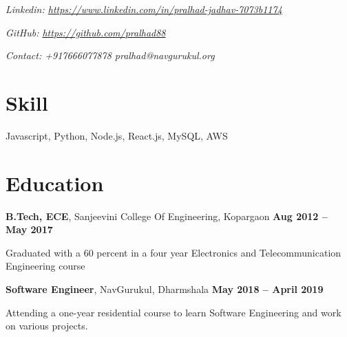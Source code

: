 \documentclass[margin,line]{resume}
\begin{document}
\begin{resume}
    \hfill \textsl{Linkedin: \url{https://www.linkedin.com/in/pralhad-jadhav-7073b1174}} 

    \hfill \textsl{GitHub: \url{https://github.com/pralhad88}} 

     \hfill \textsl{Contact: +917666077878 pralhad@navgurukul.org} 
    
    \section{\mysidestyle Skill}
    Javascript, Python, Node.js, React.js, MySQL, AWS \vspace{-1.5mm}
    
    
    \section {\mysidestyle Education}

    \textbf{B.Tech, ECE}, Sanjeevini College Of Engineering, Kopargaon \hfill \textbf{Aug 2012 -- May 2017}
    \begin{list2}
        \item Graduated with a 60 percent in a four year Electronics and Telecommunication Engineering course
    \end{list2}\vspace{-1.5mm}

    \textbf{Software Engineer}, NavGurukul, Dharmshala \hfill \textbf{May 2018 -- April 2019}
    \begin{list2}
        \item Attending a one-year residential course to learn Software Engineering and work on various projects​.
    \end{list2}\vspace{-1.5mm}

    

\end{resume}
\end{document}

